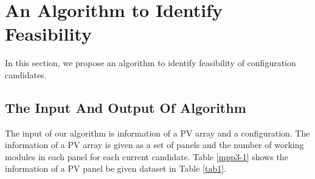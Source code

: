 \documentclass[conference]{IEEEtran}
\begin{document}
\section{An Algorithm to Identify Feasibility}
In this section, we propose an algorithm to identify feasibility of configuration candidates.
\subsection{The Input And Output Of Algorithm}

The input of our algorithm is information of a PV array and a configuration. The information of a PV array is given as a set of panels and the number of working modules in each panel for each current candidate. Table \ref{mpp3-1} shows the information of a PV panel be given dataset in Table \ref{tab1}.
\end{document}
